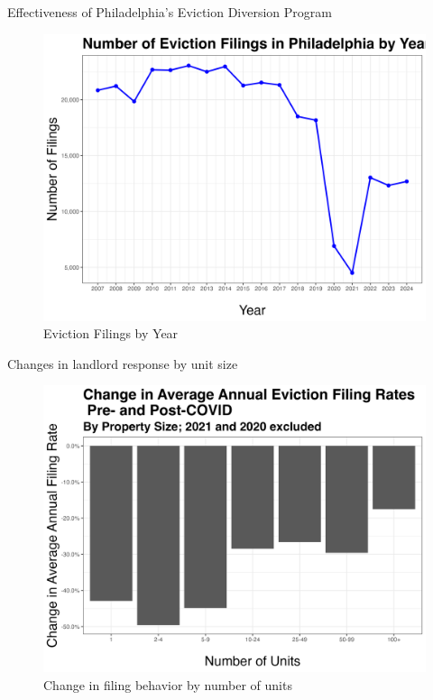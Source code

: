 \documentclass[10pt, xcolor=dvipsnames]{beamer}
\begin{document}
\begin{frame}{Effectiveness of Philadelphia's Eviction Diversion Program}
    \begin{figure}
        \centering
        \includegraphics[width=0.75\linewidth]{figs/num_eviction_filings_by_year.png}
        \caption{Eviction Filings by Year}
        \label{fig:evict-year}
    \end{figure}
\end{frame}

\begin{frame}{Changes in landlord response by unit size}
    \begin{figure}
        \centering
        \includegraphics[width=0.75\linewidth]{figs/change_in_avg_annual_eviction_filing_rates_pre_post_COVID_by_num_units.png}
        \caption{Change in filing behavior by number of units}
        \label{fig:change-evict-units}
    \end{figure}
\end{frame}
\end{document}

